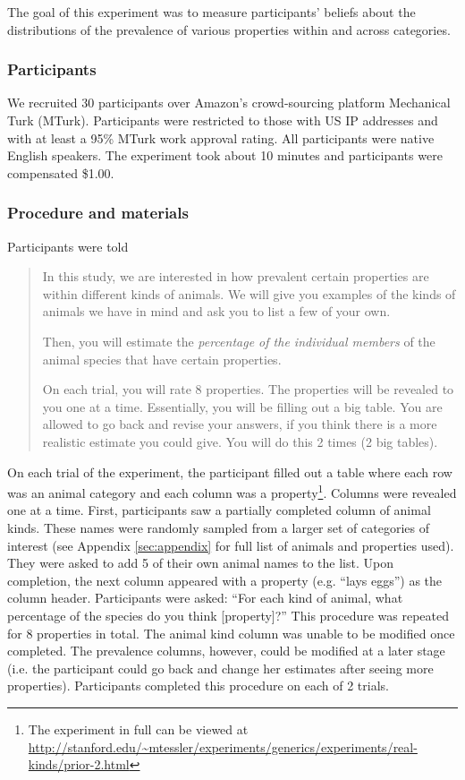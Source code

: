 \documentclass[10pt,letterpaper]{article}
\begin{document}
The goal of this experiment was to measure participants' beliefs about the distributions of the prevalence of various properties within and across categories.

\subsubsection{Participants}

We recruited 30 participants over Amazon's crowd-sourcing platform Mechanical Turk (MTurk).  Participants were restricted to those with US IP addresses and with at least a 95\% MTurk work approval rating. All participants were native English speakers. The experiment took about 10 minutes and participants were compensated \$1.00.

\subsubsection{Procedure and materials}

Participants were told 
\begin{quote}
In this study, we are interested in how prevalent certain properties are within different kinds of animals. We will give you examples of the kinds of animals we have in mind and ask you to list a few of your own.

Then, you will estimate the \emph{percentage of the individual members} of the animal species that have certain properties.

On each trial, you will rate 8 properties. The properties will be revealed to you one at a time. Essentially, you will be filling out a big table. You are allowed to go back and revise your answers, if you think there is a more realistic estimate you could give. You will do this 2 times (2 big tables). 

\end{quote}

On each trial of the experiment, the participant filled out a table where each row was an animal category and each column was a property\footnote{The experiment in full can be viewed at \url{http://stanford.edu/~mtessler/experiments/generics/experiments/real-kinds/prior-2.html}}. Columns were revealed one at a time. First, participants saw a partially completed column of animal kinds. These names were randomly sampled from a larger set of categories of interest (see Appendix \ref{sec:appendix} for full list of animals and properties used). They were asked to add 5 of their own animal names to the list. Upon completion, the next column appeared with a property (e.g. ``lays eggs'') as the column header. Participants were asked: ``For each kind of animal, what percentage of the species do you think [property]?'' This procedure was repeated for 8 properties in total. The animal kind column was unable to be modified once completed. The prevalence columns, however, could be modified at a later stage (i.e. the participant could go back and change her estimates after seeing more properties). Participants completed this procedure on each of 2 trials.
\end{document}
